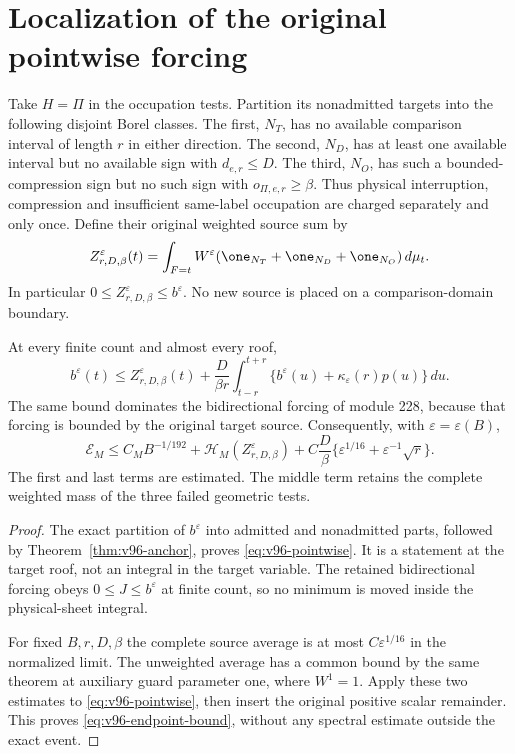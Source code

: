 \section{Localization of the original pointwise forcing}
\label{sec:v96-forcing}
Take $H=\Pi$ in the occupation tests. Partition its nonadmitted targets
into the following disjoint Borel classes. The first, $N_T$, has no
available comparison interval of length $r$ in either direction. The
second, $N_D$, has at least one available interval but no available sign
with $d_{e,r}\le D$. The third, $N_O$, has such a bounded-compression
sign but no such sign with $o_{\Pi,e,r}\ge\beta$. Thus physical
interruption, compression and insufficient same-label occupation are
charged separately and only once. Define their original weighted
source sum by
\begin{equation}\label{eq:v96-failure-source}
 Z_{r,D,\beta}^\varepsilon(t)
  =\int_{F=t}W^\varepsilon
           (\one_{N_T}+\one_{N_D}+\one_{N_O})\,d\mu_t.
\end{equation}
In particular $0\le Z_{r,D,\beta}^\varepsilon\le b^\varepsilon$.
No new source is placed on a comparison-domain boundary.

\begin{theorem}
\label{thm:v96-pointwise}
At every finite count and almost every roof,
\begin{equation}\label{eq:v96-pointwise}
 b^\varepsilon(t)\le Z_{r,D,\beta}^\varepsilon(t)
 +\frac{D}{\beta r}\int_{t-r}^{t+r}
             \{b^\varepsilon(u)+\kappa_\varepsilon(r)p(u)\}\,du.
\end{equation}
The same bound dominates the bidirectional forcing of module 228,
because that forcing is bounded by the original target source.
Consequently, with $\varepsilon=\varepsilon(B)$,
\begin{equation}\label{eq:v96-endpoint-bound}
 \mathcal E_M\le C_MB^{-1/192}
   +\mathcal H_M(Z_{r,D,\beta}^\varepsilon)
   +C\frac{D}{\beta}
                \{\varepsilon^{1/16}+\varepsilon^{-1}\sqrt r\}.
\end{equation}
The first and last terms are estimated. The middle term retains the
complete weighted mass of the three failed geometric tests.
\end{theorem}
\begin{proof}
The exact partition of $b^\varepsilon$ into admitted and nonadmitted
parts, followed by Theorem~\ref{thm:v96-anchor}, proves
\eqref{eq:v96-pointwise}. It is a statement at the target roof, not
an integral in the target variable. The retained bidirectional
forcing obeys $0\le J\le b^\varepsilon$ at finite count, so no
minimum is moved inside the physical-sheet integral.

For fixed $B,r,D,\beta$ the complete source average is at most
$C\varepsilon^{1/16}$ in the normalized limit. The unweighted
average has a common bound by the same theorem at auxiliary guard
parameter one, where $W^1=1$. Apply these two estimates to
\eqref{eq:v96-pointwise}, then insert the original positive scalar
remainder. This proves \eqref{eq:v96-endpoint-bound}, without any
spectral estimate outside the exact event.
\end{proof}


